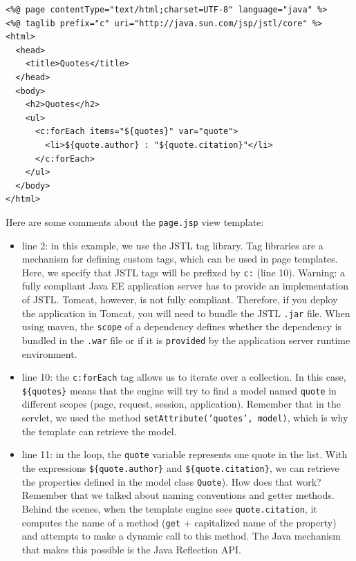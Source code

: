 \vspace{10pt}
\begin{minipage}{\linewidth}
\begin{lstlisting}[frame=single]
<%@ page contentType="text/html;charset=UTF-8" language="java" %>
<%@ taglib prefix="c" uri="http://java.sun.com/jsp/jstl/core" %>
<html>
  <head>
    <title>Quotes</title>
  </head>
  <body>
    <h2>Quotes</h2>
    <ul>
      <c:forEach items="${quotes}" var="quote">
        <li>${quote.author} : "${quote.citation}"</li>
      </c:forEach>
    </ul>
  </body>
</html>
\end{lstlisting}
\end{minipage}

Here are some comments about the \texttt{page.jsp} view template:

\begin{itemize}
\item line 2: in this example, we use the \ac{JSTL} tag library. Tag libraries are a mechanism for defining custom tags, which can be used in page templates. Here, we specify that \ac{JSTL} tags will be prefixed by \texttt{c:} (line 10). Warning: a fully compliant Java EE application server has to provide an implementation of \ac{JSTL}. Tomcat, however, is not fully compliant. Therefore, if you deploy the application in Tomcat, you will need to bundle the \ac{JSTL} \texttt{.jar} file. When using maven, the \texttt{scope} of a dependency defines whether the dependency is bundled in the \texttt{.war} file or if it is \texttt{provided} by the application server runtime environment. 
\item line 10: the \texttt{c:forEach} tag allows us to iterate over a collection. In this case, \texttt{\$\{quotes\}} means that the engine will try to find a model named \texttt{quote} in different scopes (page, request, session, application). Remember that in the servlet, we used the method \texttt{setAttribute('quotes', model)}, which is why the template can retrieve the model.
\item line 11: in the loop, the \texttt{quote} variable represents one quote in the list. With the expressions \texttt{\$\{quote.author\}} and \texttt{\$\{quote.citation\}}, we can retrieve the properties defined in the model class \texttt{Quote}). How does that work? Remember that we talked about naming conventions and getter methods. Behind the scenes, when the template engine sees \texttt{quote.citation}, it computes the name of a method (\texttt{get} + capitalized name of the property) and attempts to make a dynamic call to this method. The Java mechanism that makes this possible is the Java Reflection API.
\end{itemize}

